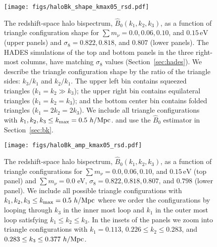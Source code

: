 \documentclass[12pt, letterpaper, preprint]{aastex62}
\newcommand{\smnu}{\sum m_\nu}
\newcommand{\sig}{\sigma_8}
\newcommand{\BOk}{\widehat{B}_0}
\begin{document}
\begin{figure}
\begin{center}
    \texttt{[image: figs/haloBk\_shape\_kmax05\_rsd.pdf]} 
    \caption{The redshift-space halo bispectrum, $\BOk(k_1, k_2, k_3)$, as a 
    function of triangle configuration shape for $\smnu = 0.0, 0.06, 0.10$, 
    and $0.15\,\mathrm{eV}$ (upper panels) and $\sig = 0.822, 0.818$, and 
    $0.807$ (lower panels). The HADES simulations of the top and bottom 
    panels in the three right-most columns, have matching $\sig$ values 
    (Section~\ref{sec:hades}). We describe the triangle configuration shape 
    by the ratio of the triangle sides: $k_3/k_1$ and $k_2/k_1$. The upper 
    left bin contains squeezed triangles ($k_1 = k_2 \gg k_3$); the upper 
    right bin contains equilateral triangles ($k_1 = k_2 = k_3$); and the 
    bottom center bin contains folded triangles ($k_1 = 2 k_2 = 2 k_3$). 
    We include all triangle configurations with $k_1, k_2, k_3 \leq k_{\rm max} = 0.5~h/{\rm Mpc}$. 
    and use the $\BOk$ estimator in Section~\ref{sec:bk}.}
\label{fig:bk_shape}
\end{center}
\end{figure}

\begin{figure}
\begin{center}
\texttt{[image: figs/haloBk\_amp\_kmax05\_rsd.pdf]}
    \caption{The redshift-space halo bispectrum, $\BOk(k_1, k_2, k_3)$, as a
    function of triangle configurations for $\smnu = 0.0, 0.06, 0.10$, 
    and $0.15\,\mathrm{eV}$ (top panel) and $\smnu = 0.0$ eV, $\sig = 0.822, 0.818, 0.807$, 
    and $0.798$ (lower panel). We include all possible triangle configurations 
    with $k_1, k_2, k_3 \leq k_{\rm max} = 0.5~h/{\rm Mpc}$ where we order
    the configurations by looping through $k_3$ in the inner most loop and 
    $k_1$ in the outer most loop satisfying $k_1 \leq k_2 \leq k_3$. In the 
    insets of the panels we zoom into triangle configurations with 
    $k_1 = 0.113$, $0.226 \leq k_2 \leq 0.283$, and $0.283 \leq k_3 \leq 0.377~h/{\rm Mpc}$.}
\label{fig:bk_amp}
\end{center}
\end{figure}


\end{document}
